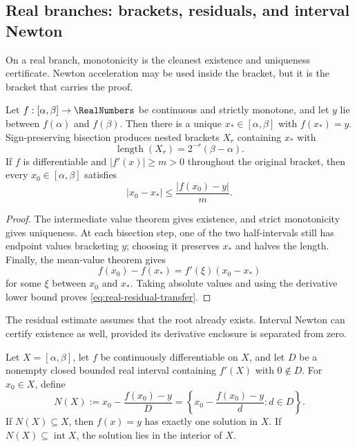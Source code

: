\subsection{Real branches: brackets, residuals, and interval Newton}
\label{sec:real-branch-certification}

On a real branch, monotonicity is the cleanest existence and uniqueness
certificate.  Newton acceleration may be used inside the bracket, but it is
the bracket that carries the proof.

\begin{theorem}
\label{thm:monotone-branch-certificate}
Let \(f:[\alpha,\beta]\to\RealNumbers\) be continuous and strictly monotone, and let
\(y\) lie between \(f(\alpha)\) and \(f(\beta)\).  Then there is a unique
\(x_*\in[\alpha,\beta]\) with \(f(x_*)=y\).  Sign-preserving bisection produces
nested brackets \(X_r\) containing \(x_*\) with
\[
 \operatorname{length}(X_r)=2^{-r}(\beta-\alpha).
\]
If \(f\) is differentiable and
\(\lvert f'(x)\rvert\ge m>0\) throughout the original bracket, then every
\(x_0\in[\alpha,\beta]\) satisfies
\begin{equation}
 \lvert x_0-x_*\rvert\le
 \frac{\lvert f(x_0)-y\rvert}{m}.
 \label{eq:real-residual-transfer}
\end{equation}
\end{theorem}

\begin{proof}
The intermediate value theorem gives existence, and strict monotonicity gives
uniqueness.  At each bisection step, one of the two half-intervals still has
endpoint values bracketing \(y\); choosing it preserves \(x_*\) and halves the
length.  Finally, the mean-value theorem gives
\[
 f(x_0)-f(x_*)=f'(\xi)(x_0-x_*)
\]
for some \(\xi\) between \(x_0\) and \(x_*\).  Taking absolute values and using
the derivative lower bound proves \eqref{eq:real-residual-transfer}.
\end{proof}

The residual estimate assumes that the root already exists.  Interval Newton
can certify existence as well, provided its derivative enclosure is separated
from zero.

\begin{theorem}
\label{thm:interval-newton-one-dimensional}
Let \(X=[\alpha,\beta]\), let \(f\) be continuously differentiable on \(X\),
and let \(D\) be a nonempty closed bounded real interval containing \(f'(X)\)
with \(0\notin D\).
For \(x_0\in X\), define
\[
 N(X):=x_0-\frac{f(x_0)-y}{D}
 =\left\{x_0-\frac{f(x_0)-y}{d}:d\in D\right\}.
\]
If \(N(X)\subseteq X\), then \(f(x)=y\) has exactly one solution in \(X\).
If \(N(X)\subseteq\operatorname{int}X\), the solution lies in the interior of
\(X\).
\end{theorem}

